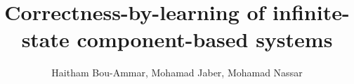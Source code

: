 \title{Correctness-by-learning of infinite-state component-based systems}

\author{Haitham Bou-Ammar, Mohamad Jaber, Mohamad Nassar}
